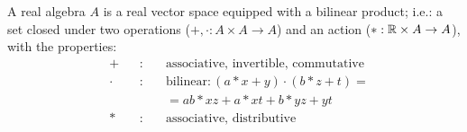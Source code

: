 \begin{definition}[Algebra]
    A real algebra $A$ is a real vector space equipped with a bilinear product; i.e.: a set closed under two operations ($+, \cdot: A\times A \to A$) and an action ($*: \mathbb{R} \times A \to A$), with the properties:
    \[\begin{alignedat}{3}
        &+ &&: \ &&\text{associative, invertible, commutative}\\
        &\cdot &&: \ &&\text{bilinear}: (a*x + y)\cdot (b*z + t) = \\
        & && &&= ab*xz + a*xt + b*yz + yt  \\
        &* &&: \ &&\text{associative, distributive}
    \end{alignedat}\]
\end{definition}
